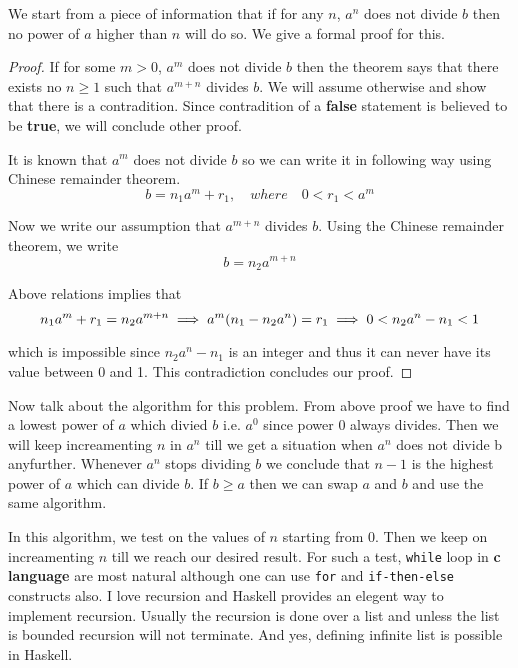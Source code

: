 \documentclass{article}%
\begin{document}
We start from a piece of information that if for any $n$, $a^n$ does not
divide $b$ then no power of $a$ higher than $n$ will do so. We give a
formal proof for this.

\begin{proof} 
If for some $m > 0$, $a^m$ does not divide $b$ then the theorem says
that there exists no $n \geq 1$ such that $a^{m+n}$ divides $b$. We
will assume otherwise and show that there is a contradition. Since
contradition of a \textbf{false} statement is believed to be
\textbf{true}, we will conclude other proof.

It is known that $a^m$ does not divide $b$ so we can write it in
following way using Chinese remainder theorem.
\begin{equation*}
b = n_1 a^m + r_1, \quad where \quad 0 < r_1 < a^m 
\end{equation*}

Now we write our assumption that $a^{m+n}$ divides $b$. Using the
Chinese remainder theorem, we write
\begin{equation*}
b = n_2 a^{m+n} 
\end{equation*}

Above relations implies that
\begin{equation*}
n_1 a^m + r_1 = n_2 a^{m+n} \\
\implies a^m (n_1 - n_2 a^n ) = r_1 \\
\implies 0 < n_2 a^n - n_1 < 1
\end{equation*}

which is impossible since $n_2 a^n - n_1$ is an integer and thus it can
never have its value between 0 and 1. This contradiction concludes our
proof.
\end{proof}

Now talk about the algorithm for this problem. From above proof we
have to find a lowest power of $a$ which divied $b$ i.e. $a^0$ since
power 0 always divides. Then we will keep increamenting $n$ in $a^n$
till we get a situation when $a^n$ does not divide b anyfurther.
Whenever $a^n$ stops dividing $b$ we conclude that $n-1$ is the
highest power of $a$ which can divide $b$. If $b \geq a$ then we can
swap $a$ and $b$ and use the same algorithm.

In this algorithm, we test on the values of $n$ starting from $0$.
Then we keep on increamenting $n$ till we reach our desired result.
For such a test, \texttt{while} loop in \textbf{c language} are most
natural although one can use \texttt{for} and \texttt{if-then-else}
constructs also. I love recursion and Haskell provides an elegent way
to implement recursion. Usually the recursion is done over a list and
unless the list is bounded recursion will not terminate. And yes,
defining infinite list is possible in Haskell.
\end{document}
